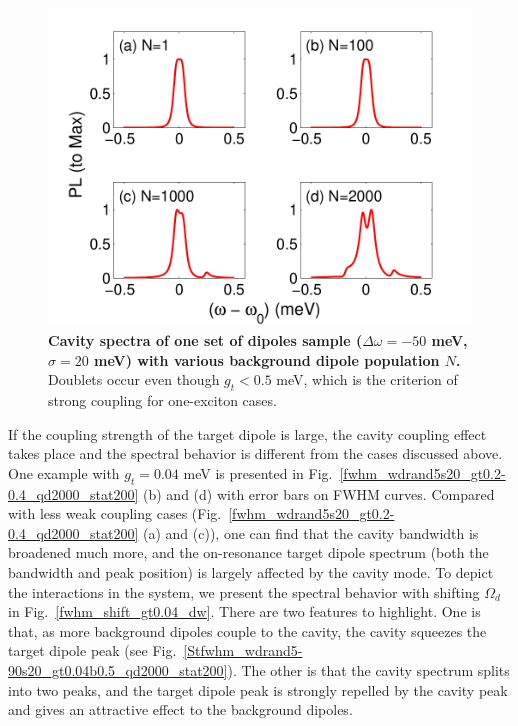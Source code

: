 \begin{figure}[thp]%
\centering
\begin{center}
\includegraphics[width=12cm]{./Figs/spec1tNb_wd50s20_gt0dot04E0dot5_stat200} %
\end{center}
\caption[Spectra sample for a cavity with a target dipole and an ensemble.]{\textbf{Cavity spectra of one set of dipoles sample ($\Delta\omega=-50$ meV, $\sigma=20$ meV) with various background dipole population $N$.} Doublets occur even though $g_t<0.5$ meV, which is the criterion of strong coupling for one-exciton cases.}
\label{spec1tNb_wd50s20_gt0.04E0.5_stat200}
\end{figure}


If the coupling strength of the target dipole is large, the cavity coupling effect takes place and the spectral behavior is different from the cases discussed above. One example with $g_t=0.04$ meV is presented in Fig.~\ref{fwhm_wdrand5s20_gt0.2-0.4_qd2000_stat200} (b) and (d) with error bars on FWHM curves. Compared with less weak coupling cases (Fig.~\ref{fwhm_wdrand5s20_gt0.2-0.4_qd2000_stat200} (a) and (c)), one can find that the cavity bandwidth is broadened much more, and the on-resonance target dipole spectrum (both the bandwidth and peak position) is largely affected by the cavity mode. To depict the interactions in the system, we present the spectral behavior with shifting $\Omega_d$ in Fig.~\ref{fwhm_shift_gt0.04_dw}. There are two features to highlight. One is that, as more background dipoles couple to the cavity, the cavity squeezes the target dipole peak (see Fig.~\ref{Stfwhm_wdrand5-90s20_gt0.04b0.5_qd2000_stat200}). The other is that the cavity spectrum splits into two peaks, and the target dipole peak is strongly repelled by the cavity peak and gives an attractive effect to the background dipoles.

